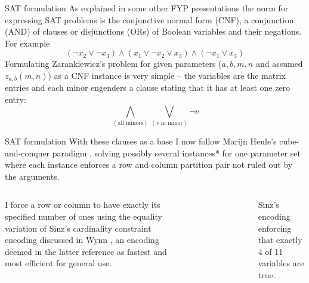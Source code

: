 \documentclass[10pt]{beamer}
\begin{document}
\begin{frame}{SAT formulation}
As explained in some other FYP presentations the norm for expressing SAT problems is the conjunctive normal form (CNF), a conjunction (AND) of clauses or disjunctions (ORs) of Boolean variables and their negations. For example
\begin{equation*}
    (\neg x_2\lor\neg x_3)\land(x_1\lor\neg x_2\lor x_3)\land(\neg x_1\lor x_3)
\end{equation*}
Formulating Zarankiewicz's problem for given parameters ($a,b,m,n$ and assumed $z_{a,b}(m,n)$) as a CNF instance is very simple -- the variables are the matrix entries and each minor engenders a clause stating that it has at least one zero entry:
\begin{equation*}
    \bigwedge_{(\text{all minors})}\bigvee_{(v\text{ in minor})}\neg v
\end{equation*}
\end{frame}

{
\begin{frame}{SAT formulation}
With these clauses as a base I now follow Marijn Heule's cube-and-conquer paradigm \cite{cubeandconquer},
solving possibly several instances* for one parameter set where each instance enforces a row and column partition pair not ruled out by the arguments.
\begin{columns}[T,onlytextwidth]
      I force a row or column to have exactly its specified number of ones using the equality variation of Sinz's cardinality constraint encoding \cite{sinz} discussed in Wynn \cite{cardconstraint}, an encoding deemed in the latter reference as fastest and most efficient for general use.
      \begin{figure}
      \centering
      \end{figure}
      \footnotesize{Sinz's encoding enforcing that exactly 4 of 11 variables are true.}
  \end{columns}
\end{frame}
}
\end{document}
